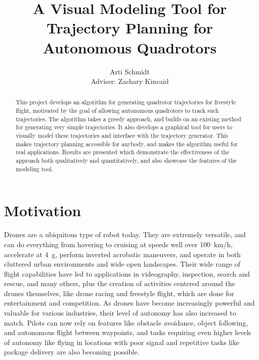 \documentclass[pageno]{jpaper}
\begin{document}
\title{A Visual Modeling Tool for Trajectory Planning for Autonomous Quadrotors}

\author{Arti Schmidt \\ Adviser: Zachary Kincaid}

\date{}
\maketitle

\thispagestyle{empty}
\doublespacing
\begin{abstract}
This project develops an algorithm for generating quadrotor trajectories for freestyle flight, motivated by the goal of allowing autonomous quadrotors to track such trajectories. The algorithm takes a greedy approach, and builds on an existing method for generating very simple trajectories. It also develops a graphical tool for users to visually model these trajectories and interface with the trajectory generator. This makes trajectory planning accessible for anybody, and makes the algorithm useful for real applications. Results are presented which demonstrate the effectiveness of the approach both qualitatively and quantitatively, and also showcase the features of the modeling tool.
\end{abstract}

\section{Motivation}

Drones are a ubiquitous type of robot today. They are extremely versatile, and can do everything from hovering to cruising at speeds well over \qty{100}{km/h}, accelerate at \qty{4}{g}, perform inverted acrobatic maneuvers, and operate in both cluttered urban environments and wide open landscapes. Their wide range of flight capabilities have led to applications in videography, inspection, search and rescue, and many others, plus the creation of activities centered around the drones themselves, like drone racing and freestyle flight, which are done for entertainment and competition. As drones have become increasingly powerful and valuable for various industries, their level of autonomy has also increased to match. Pilots can now rely on features like obstacle avoidance, object following, and autonomous flight between waypoints, and tasks requiring even higher levels of autonomy like flying in locations with poor signal and repetitive tasks like package delivery are also becoming possible.
\end{document}
